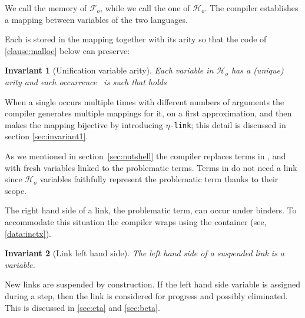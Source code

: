 \documentclass[sigconf,natbib=false,review]{acmart}
\newtheorem{invariant}{Invariant}
\newcommand{\linkMacro}[1]{\ensuremath{#1}\texttt{-link}\xspace}
\newcommand{\linketa} {\linkMacro{\eta}}
\newcommand{\Fo}{\ensuremath{\mathcal{F}_{\!o}\xspace}} %
\newcommand{\Ho}{\ensuremath{\mathcal{H}_o}\xspace}
\begin{document}



\noindent
We call  the memory of \Fo{}, while we call 
the one of \Ho.
The compiler establishes a mapping between variables of the two languages.



Each  is stored in the mapping together with
its arity so that the code of \ref{clause:malloc} below can preserve:

\begin{invariant}[Unification variable arity]
  Each variable 
  in \Ho has a (unique) arity  and each occurrence~
   is such that  holds
  \label{inv:uvaarity}
\end{invariant}



\noindent
When a single  occurs multiple times with different numbers
of arguments the compiler generates multiple mappings for it, on a first
approximation, and then makes the mapping bijective by introducing
\linketa; this detail is discussed in section \ref{sec:invariant1}.


\noindent
As we mentioned in section~\ref{sec:nutshell} the compiler
replaces terms in \maybeeta, \maybebeta and \notllambda with fresh
variables linked to the problematic terms. Terms in \maybebeta do not
need a link since \Ho{} variables faithfully represent
the problematic term thanks to their scope.



\noindent
The right hand side of a link, the problematic term, can occur under binders.
To accommodate this situation the compiler wraps  using
the  container (see, \ref{data:inctx}).

\begin{invariant}[Link left hand side]\label{inv:linklhs}
  The left hand side of a suspended link
  is a variable.
\end{invariant}

\noindent
New links are suspended by construction.
If the left hand side variable is assigned during a step, then 
the link is considered for progress and possibly eliminated.
This is discussed in \cref{sec:eta} and \cref{sec:beta}.


% 
\end{document}
